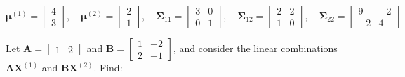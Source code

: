 \documentclass[12pt]{article}
\begin{document}
$$
\boldsymbol{\mu}^{(1)} = \begin{bmatrix} 4 \\ 3 \end{bmatrix}, \quad
\boldsymbol{\mu}^{(2)} = \begin{bmatrix} 2 \\ 1 \end{bmatrix}, \quad
\boldsymbol{\Sigma}_{11} = \begin{bmatrix} 3 & 0 \\ 0 & 1 \end{bmatrix}, \quad
\boldsymbol{\Sigma}_{12} = \begin{bmatrix} 2 & 2 \\ 1 & 0 \end{bmatrix}, \quad
\boldsymbol{\Sigma}_{22} = \begin{bmatrix} 9 & -2 \\ -2 & 4 \end{bmatrix}
$$

\noindent Let $\mathbf{A} = \begin{bmatrix} 1 & 2 \end{bmatrix}$ and $\mathbf{B} = \begin{bmatrix} 1 & -2 \\ 2 & -1 \end{bmatrix}$, and consider the linear combinations $\mathbf{A}\mathbf{X}^{(1)}$ and $\mathbf{B}\mathbf{X}^{(2)}$. Find:
\end{document}
